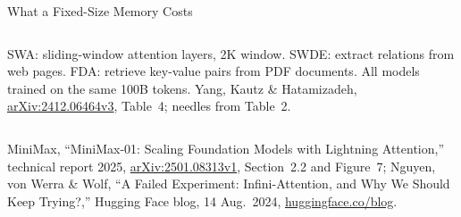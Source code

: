 \begin{frame}{What a Fixed-Size Memory Costs}
\begin{columns}[T,onlytextwidth]
      \vspace{0.4em}
      {\scriptsize SWA: sliding-window attention layers, 2K window. SWDE: extract relations from web pages. FDA: retrieve key-value pairs from PDF documents. All models trained on the same 100B tokens. Yang, Kautz \& Hatamizadeh, \href{https://arxiv.org/abs/2412.06464v3}{arXiv:2412.06464v3}, Table~4; needles from Table~2.}
  \end{columns}
  \vspace{0.2em}
  {\scriptsize MiniMax, ``MiniMax-01: Scaling Foundation Models with Lightning Attention,'' technical report 2025, \href{https://arxiv.org/abs/2501.08313v1}{arXiv:2501.08313v1}, Section~2.2 and Figure~7; Nguyen, von Werra \& Wolf, ``A Failed Experiment: Infini-Attention, and Why We Should Keep Trying?,'' Hugging Face blog, 14 Aug.\ 2024, \href{https://huggingface.co/blog/infini-attention}{huggingface.co/blog}.}
\end{frame}

